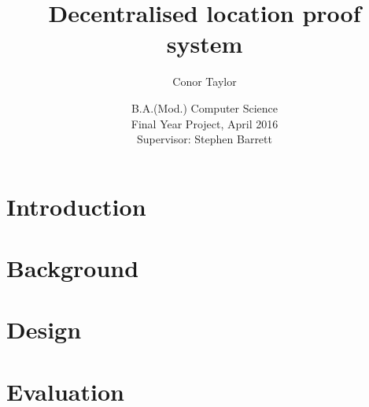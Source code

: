 \documentclass[12pt]{report}
\title{Decentralised location proof system}
\author{Conor Taylor}
\date{
	B.A.(Mod.) Computer Science\\
	Final Year Project, April 2016\\
	Supervisor: Stephen Barrett
}
\begin{document}
\maketitle

\tableofcontents
\newpage

\listoffigures
\newpage

\chapter{Introduction}


\chapter{Background}


\chapter{Design}


\chapter{Evaluation}

\end{document}
